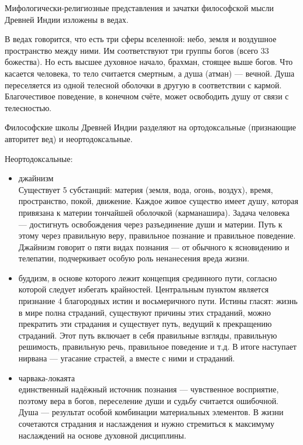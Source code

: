  Мифологически-религиозные представления и зачатки философской мысли Древней Индии изложены в ведах.

 В ведах говорится, что есть три сферы вселенной: небо, земля и воздушное пространство между ними. Им соответствуют три группы богов (всего 33 божества). Но есть высшее духовное начало, брахман, стоящее выше богов. Что касается человека, то тело считается смертным, а душа (атман) --- вечной. Душа переселяется из одной телесной оболочки в другую в соответствии с кармой. Благочестивое поведение, в конечном счёте, может освободить душу от связи с телесностью.

 Философские школы Древней Индии разделяют на ортодоксальные (признающие авторитет вед) и неортодоксальные.

 Неортодоксальные:
 \begin{itemize}
    \itemsep-1ex
    \item джайнизм\\
    Существует 5 субстанций: материя (земля, вода, огонь, воздух), время, пространство, покой, движение.
    Каждое живое существо имеет душу, которая привязана к материи тончайшей оболочкой (карманашира). Задача человека --- достигнуть освобождения через разъединение души и материи. Путь к этому через правильную веру, правильное познание и правильное поведение. Джайнизм говорит о пяти видах познания --- от обычного к ясновидению и телепатии, подчеркивает особую роль ненанесения вреда жизни.
    \item буддизм, в основе которого лежит концепция срединного пути, согласно которой следует избегать крайностей. Центральным пунктом является признание 4 благородных истин и восьмеричного пути. Истины гласят: жизнь в мире полна страданий, существуют причины этих страданий, можно прекратить эти страдания и существует путь, ведущий к прекращению страданий. Этот путь включает в себя правильные взгляды, правильную решимость, правильную речь, правильное поведение и т.д. В итоге наступает нирвана --- угасание страстей, а вместе с ними и страданий.
    \item чарвака-локаята\\
    единственный надёжный источник познания --- чувственное восприятие, поэтому вера в богов, переселение души и судьбу считается ошибочной. Душа --- результат особой комбинации материальных элементов. В жизни сочетаются страдания и наслаждения и нужно стремиться к максимуму наслаждений на основе духовной дисциплины.
\end{itemize}
 
